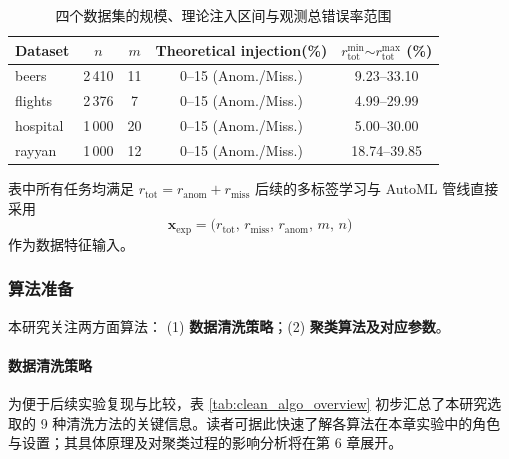 \documentclass[10pt]{article} %
\numberwithin{equation}{section}
\begin{document}
\begin{table}[htbp]
  \centering
  \setlength{\tabcolsep}{5pt}
  \begin{tabular}{lcccc}
    \toprule
    Dataset & $n$ & $m$ & Theoretical injection(\%) & $r_{\text{tot}}^{\min}$\(\sim\)$r_{\text{tot}}^{\max}$ (\%)\\
    \midrule
    beers    & 2\,410 & 11 & 0--15 (Anom./Miss.) & 9.23--33.10 \\
    flights  & 2\,376 & 7  & 0--15 (Anom./Miss.) & 4.99--29.99 \\
    hospital & 1\,000 & 20 & 0--15 (Anom./Miss.) & 5.00--30.00 \\
    rayyan   & 1\,000 & 12 & 0--15 (Anom./Miss.) & 18.74--39.85 \\
    \bottomrule
  \end{tabular}
  \caption{四个数据集的规模、理论注入区间与观测总错误率范围}
  \label{tab:dataset_overview}
\end{table}

\noindent
\textcolor[rgb]{0.00,0.07,1.00}{表中所有任务均满足 \(r_{\text{tot}} = r_{\text{anom}} + r_{\text{miss}}\)
后续的多标签学习与 AutoML 管线直接采用
\[
  \mathbf{x}_{\text{exp}}
  = \bigl(r_{\text{tot}},\,r_{\text{miss}},\,r_{\text{anom}},\,m,\,n\bigr)
\]
作为数据特征输入。}


\subsubsection{算法准备}
\label{sec:algo_prep}

本研究关注两方面算法：
(1) \textbf{数据清洗策略}；(2) \textbf{聚类算法及对应参数}。

\paragraph{数据清洗策略}   
\textcolor[rgb]{0.00,0.07,1.00}{为便于后续实验复现与比较，表 \ref{tab:clean_algo_overview} 初步汇总了本研究选取的 9 种清洗方法的关键信息。读者可据此快速了解各算法在本章实验中的角色与设置；其具体原理及对聚类过程的影响分析将在第 6 章展开。}
\end{document}
